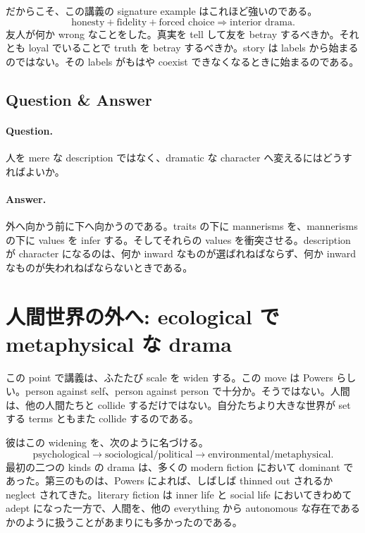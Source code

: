 だからこそ、この講義の signature example はこれほど強いのである。
\begin{equation}
\text{honesty} + \text{fidelity} + \text{forced choice} \Rightarrow \text{interior drama}.
\end{equation}
友人が何か wrong なことをした。真実を tell して友を betray するべきか。それとも loyal でいることで truth を betray するべきか。story は labels から始まるのではない。その labels がもはや coexist できなくなるときに始まるのである。

\subsection{Question \& Answer}

\paragraph{Question.} 人を mere な description ではなく、dramatic な character へ変えるにはどうすればよいか。

\paragraph{Answer.} 外へ向かう前に下へ向かうのである。traits の下に mannerisms を、mannerisms の下に values を infer する。そしてそれらの values を衝突させる。description が character になるのは、何か inward なものが選ばれねばならず、何か inward なものが失われねばならないときである。

\section{人間世界の外へ: ecological で metaphysical な drama}

この point で講義は、ふたたび scale を widen する。この move は Powers らしい。person against self、person against person で十分か。そうではない。人間は、他の人間たちと collide するだけではない。自分たちより大きな世界が set する terms ともまた collide するのである。

彼はこの widening を、次のように名づける。
\begin{equation}
\text{psychological} \to \text{sociological/political} \to \text{environmental/metaphysical}.
\end{equation}
最初の二つの kinds の drama は、多くの modern fiction において dominant であった。第三のものは、Powers によれば、しばしば thinned out されるか neglect されてきた。literary fiction は inner life と social life においてきわめて adept になった一方で、人間を、他の everything から autonomous な存在であるかのように扱うことがあまりにも多かったのである。

